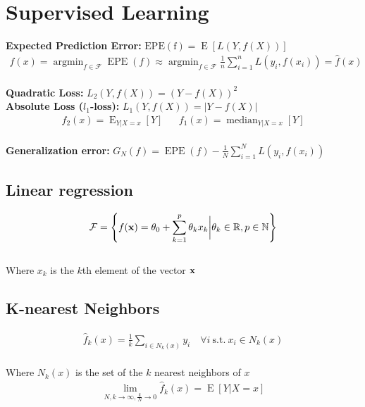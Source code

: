 \section{Supervised Learning}
%
\begin{mdframed}[style=eqbox]
\textbf{Expected Prediction Error:} $\operatorname{EPE(f)} = \operatorname E \left[ L(Y,f(X)) \right]$
\vspace*{-8pt}\begin{align*}
  f(x) = \operatorname{argmin}_{f \in \mathcal F} \operatorname{EPE}(f) \approx \operatorname{argmin}_{f \in \mathcal F} \frac{1}{n} \sum_{i=1}^{n} L(y_i, f(x_i)) = \hat{f}(x)
\end{align*}\vspace*{-10pt}\\
\textbf{Quadratic Loss:} $L_2(Y,f(X)) = (Y-f(X))^2$\\
\textbf{Absolute Loss ($l_1$-loss):} $L_1(Y,f(X)) = \vert Y-f(X) \vert$
\vspace*{-4pt}\begin{align*}
  f_2(x) = \operatorname E_{Y \vert X = x}[Y] && f_1(x) = \operatorname{median}_{Y \vert X = x}[Y]
\end{align*}\vspace*{-12pt}\\
\textbf{Generalization error:} $G_N(f) = \operatorname{EPE}(f) - \frac{1}{N} \sum_{i=1}^{N} L(y_i, f(x_i))$
\end{mdframed}
%
\begin{mdframed}[style=eqbox]
\subsection{Linear regression}
\vspace*{-6pt}\begin{align*}
\mathcal{F} = \left\{f(\mathbf{x}) = \theta_0 + \sum_{k = 1}^p \theta_k x_k \biggr\vert \theta_k \in \mathbb R, p \in \mathbb{N}\right\}
\end{align*}\vspace*{-10pt}\\
\small{Where $x_k$ is the $k$th element of the vector $\mathbf{x}$}
\end{mdframed}
%
\begin{mdframed}[style=eqbox]
\subsection{K-nearest Neighbors}
\vspace*{-6pt}\begin{align*}
\hat{f}_k(x) = \frac{1}{k} \sum_{i \in N_k(x)} y_i \quad \forall i \mathrm{~s.t.~} x_i \in N_k(x)
\end{align*}\vspace*{-10pt}\\
\small{Where $N_k(x)$ is the set of the $k$ nearest neighbors of $x$}
\vspace*{-4pt}\begin{align*}
\lim_{N,k \to \infty, \frac{k}{N} \to 0} \hat{f}_k(x) = \operatorname E[Y \vert X = x]
\end{align*}
\end{mdframed}
